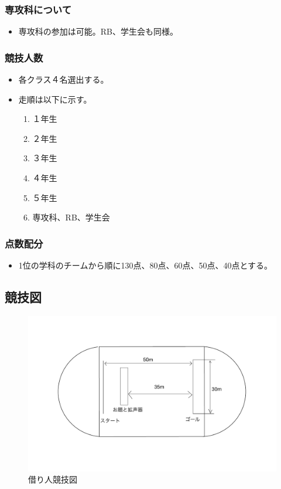 \documentclass[titlepage]{jarticle}
\begin{document}
   \subsubsection{専攻科について}
    \begin{itemize}
     \item 専攻科の参加は可能。RB、学生会も同様。
    \end{itemize}
   \subsubsection{競技人数}
    \begin{itemize}
     \item 各クラス４名選出する。 
     \item 走順は以下に示す。 
     \begin{enumerate}
      \item １年生 
      \item ２年生 
      \item ３年生 
      \item ４年生 
      \item ５年生 
      \item 専攻科、RB、学生会
     \end{enumerate}
    \end{itemize}
   \subsubsection{点数配分}
    \begin{itemize}
     \item 1位の学科のチームから順に130点、80点、60点、50点、40点とする。
    \end{itemize}
  \subsection{競技図}
   \begin{figure}[H]
    \centering
    \includegraphics[width=12cm]{borrow.pdf}
    \caption{借り人競技図}
   \end{figure}
\end{document}

